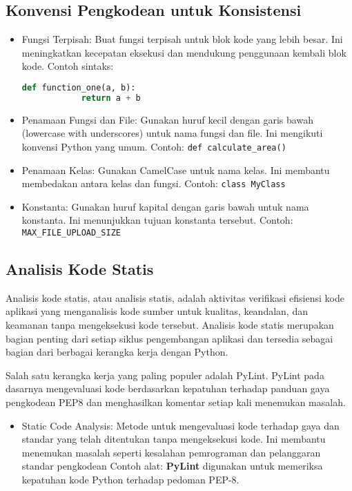 \documentclass{article}
\begin{document}
\subsection{Konvensi Pengkodean untuk Konsistensi}
\begin{itemize}
    \item Fungsi Terpisah: Buat fungsi terpisah untuk blok kode yang lebih besar. Ini meningkatkan kecepatan eksekusi dan mendukung penggunaan kembali blok kode. Contoh sintaks:
          \begin{lstlisting}[language=Python, caption={}, captionpos=b]
            def function_one(a, b):
            return a + b
        \end{lstlisting}
    \item Penamaan Fungsi dan File: Gunakan huruf kecil dengan garis bawah (lowercase with underscores) untuk nama fungsi dan file. Ini mengikuti konvensi Python yang umum. Contoh: \verb|def calculate_area()|
    \item Penamaan Kelas: Gunakan CamelCase untuk nama kelas. Ini membantu membedakan antara kelas dan fungsi. Contoh: \verb|class MyClass|
    \item Konstanta: Gunakan huruf kapital dengan garis bawah untuk nama konstanta. Ini menunjukkan tujuan konstanta tersebut. Contoh: \verb|MAX_FILE_UPLOAD_SIZE|
\end{itemize}

\subsection{Analisis Kode Statis}
Analisis kode statis, atau analisis statis, adalah aktivitas verifikasi efisiensi kode aplikasi yang menganalisis kode sumber untuk kualitas, keandalan, dan keamanan tanpa mengeksekusi kode tersebut. Analisis kode statis merupakan bagian penting dari setiap siklus pengembangan aplikasi dan tersedia sebagai bagian dari berbagai kerangka kerja dengan Python.

Salah satu kerangka kerja yang paling populer adalah PyLint. PyLint pada dasarnya mengevaluasi kode berdasarkan kepatuhan terhadap panduan gaya pengkodean PEP8 dan menghasilkan komentar setiap kali menemukan masalah.

\begin{itemize}
    \item Static Code Analysis: Metode untuk mengevaluasi kode terhadap gaya dan standar yang telah ditentukan tanpa mengeksekusi kode. Ini membantu menemukan masalah seperti kesalahan pemrograman dan pelanggaran standar pengkodean Contoh alat: \textbf{PyLint} digunakan untuk memeriksa kepatuhan kode Python terhadap pedoman PEP-8.
\end{itemize}
\end{document}
